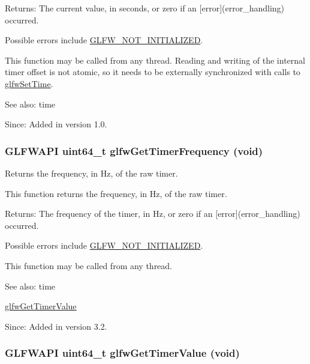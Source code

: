 \begin{Desc}
\item[Returns:]The current value, in seconds, or zero if an \mbox{[}error\mbox{]}(error\_\-handling) occurred.\end{Desc}
Possible errors include \hyperlink{group__errors_g2374ee02c177f12e1fa76ff3ed15e14a}{GLFW\_\-NOT\_\-INITIALIZED}.

This function may be called from any thread. Reading and writing of the internal timer offset is not atomic, so it needs to be externally synchronized with calls to \hyperlink{group__input_g94360a3628a09f32708f83cc3fa48590}{glfwSetTime}.

\begin{Desc}
\item[See also:]time\end{Desc}
\begin{Desc}
\item[Since:]Added in version 1.0. \end{Desc}
\hypertarget{group__input_ga92d10b10013372778efbf6367714371}{
\subsubsection[glfwGetTimerFrequency]{\setlength{\rightskip}{0pt plus 5cm}GLFWAPI uint64\_\-t glfwGetTimerFrequency (void)}}
\label{group__input_ga92d10b10013372778efbf6367714371}


Returns the frequency, in Hz, of the raw timer. 

This function returns the frequency, in Hz, of the raw timer.

\begin{Desc}
\item[Returns:]The frequency of the timer, in Hz, or zero if an \mbox{[}error\mbox{]}(error\_\-handling) occurred.\end{Desc}
Possible errors include \hyperlink{group__errors_g2374ee02c177f12e1fa76ff3ed15e14a}{GLFW\_\-NOT\_\-INITIALIZED}.

This function may be called from any thread.

\begin{Desc}
\item[See also:]time 

\hyperlink{group__input_ga00c3e32227eb70b3968fca0bfe4ae26}{glfwGetTimerValue}\end{Desc}
\begin{Desc}
\item[Since:]Added in version 3.2. \end{Desc}
\hypertarget{group__input_ga00c3e32227eb70b3968fca0bfe4ae26}{
\subsubsection[glfwGetTimerValue]{\setlength{\rightskip}{0pt plus 5cm}GLFWAPI uint64\_\-t glfwGetTimerValue (void)}}
\label{group__input_ga00c3e32227eb70b3968fca0bfe4ae26}



